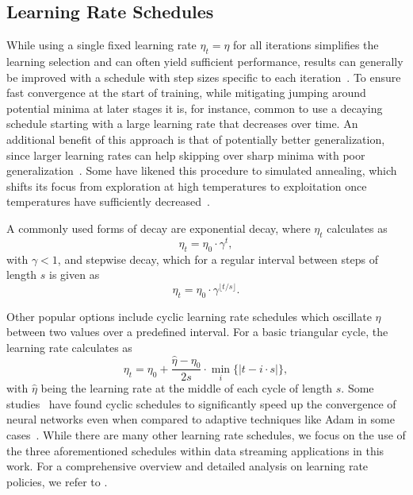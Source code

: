 \documentclass[letterpaper]{article} %
\begin{document}
\subsection{Learning Rate Schedules}

While using a single fixed learning rate $\eta_t = \eta$ for all iterations simplifies the learning selection and can often yield sufficient performance, results can generally be improved with a schedule with step sizes specific to each iteration~\cite{wuDemystifyingLearningRate2019b}.
To ensure fast convergence at the start of training, while mitigating jumping around potential minima at later stages it is, for instance, common to use a decaying schedule starting with a large learning rate that decreases over time.
An additional benefit of this approach is that of potentially better generalization, since larger learning rates can help skipping over sharp minima with poor generalization~\cite{hochreiterFlatMinima1997,chaudhariEntropySGDBiasingGradient2017}.
Some have likened this procedure to simulated annealing, which shifts its focus from exploration at high temperatures to exploitation once temperatures have sufficiently decreased~\cite{smithDonDecayLearning2018}.

A commonly used forms of decay are exponential decay, where $\eta_{t}$ calculates as
\begin{equation}
	\eta_{t} = \eta_0 \cdot \gamma^t,
\end{equation}
with $\gamma < 1$, and stepwise decay, which for a regular interval between steps of length $s$ is given as
\begin{equation}
	\eta_{t} = \eta_0 \cdot \gamma^{\lfloor t/s \rfloor}.
\end{equation}

Other popular options include cyclic learning rate schedules which oscillate $\eta$ between two values over a predefined interval.
For a basic triangular cycle, the learning rate calculates as
\begin{equation}
	\eta_t = \eta_0 + \frac{\hat{\eta} - \eta_0}{2s} \cdot \min_{i} \{|t-i\cdot s|\},
\end{equation}
with $\hat{\eta}$ being the learning rate at the middle of each cycle of length $s$.
Some studies~\cite{smithCyclicalLearningRates2017, smithSuperConvergenceVeryFast2018a} have found cyclic schedules to significantly speed up the convergence of neural networks even when compared to adaptive techniques like Adam in some cases~\cite{kingmaAdamMethodStochastic2017b}.
While there are many other learning rate schedules, we focus on the use of the three aforementioned schedules within data streaming applications in this work.
For a comprehensive overview and detailed analysis on learning rate policies, we refer to \citet{wuDemystifyingLearningRate2019b}.
\end{document}
